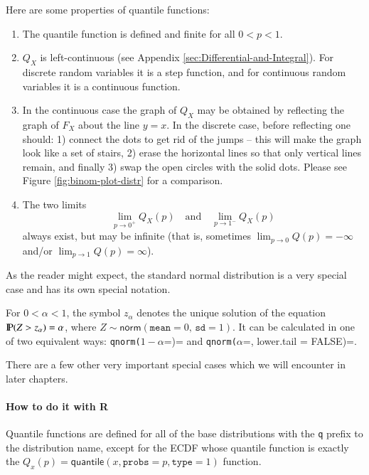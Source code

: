 \documentclass[captions=tableheading]{scrbook}
\begin{document}
\begin{rem}
Here are some properties of quantile functions:
\begin{enumerate}
\item The quantile function is defined and finite for all \(0<p<1\).
\item \(Q_{X}\) is left-continuous (see Appendix \ref{sec:Differential-and-Integral}). For discrete random variables it is a step function, and for continuous random variables it is a continuous function.
\item In the continuous case the graph of \(Q_{X}\) may be obtained by reflecting the graph of \(F_{X}\) about the line \(y=x\). In the discrete case, before reflecting one should: 1) connect the dots to get rid of the jumps -- this will make the graph look like a set of stairs, 2) erase the horizontal lines so that only vertical lines remain, and finally 3) swap the open circles with the solid dots. Please see Figure \ref{fig:binom-plot-distr} for a comparison.
\item The two limits
   \[
   \lim_{p\to0^{+}}Q_{X}(p)\quad\mbox{and}\quad\lim_{p\to1^{-}}Q_{X}(p)
   \]
   always exist, but may be infinite (that is, sometimes \(\lim_{p\to0}Q(p)=-\infty\) and/or \(\lim_{p\to1}Q(p)=\infty\)).
\end{enumerate}

\end{rem}

As the reader might expect, the standard normal distribution is a very special case and has its own special notation.

\begin{defn}
For \(0<\alpha<1\), the symbol \(z_{\alpha}\) denotes the unique solution of the equation \(\P(Z>z_{\alpha})=\alpha\), where \(Z\sim\mathsf{norm}(\mathtt{mean}=0,\,\mathtt{sd}=1)\). It can be calculated in one of two equivalent ways: \texttt{qnorm(}\(1-\alpha\)=)= and \texttt{qnorm(}\(\alpha\)=, lower.tail = FALSE)=. 
\end{defn}

There are a few other very important special cases which we will encounter in later chapters. 


\paragraph*{How to do it with \textsf{R}}

Quantile functions are defined for all of the base distributions with the \texttt{q} prefix to the distribution name, except for the ECDF whose quantile function is exactly the \( Q_{x}(p) = \mathsf{quantile}(x, \mathtt{probs} = p, \mathtt{type} = 1) \) function. 
\end{document}
